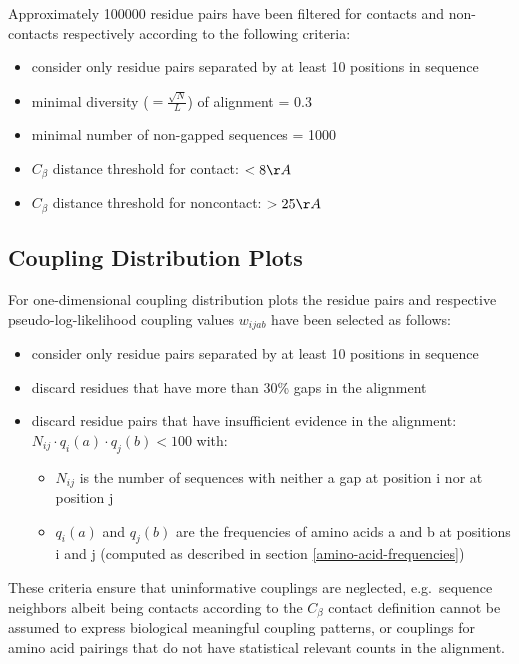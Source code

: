 \documentclass[12pt,a4paper,twoside]{book}
\providecommand{\tightlist}{%
  \setlength{\itemsep}{0pt}\setlength{\parskip}{0pt}}
\newcommand{\Cb}{C_\beta}
\newcommand{\wijab}{w_{ijab}}
\theoremstyle{definition}
\theoremstyle{definition}
\theoremstyle{remark}
\begin{document}
Approximately 100000 residue pairs have been filtered for contacts and
non-contacts respectively according to the following criteria:

\begin{itemize}
\tightlist
\item
  consider only residue pairs separated by at least 10 positions in
  sequence
\item
  minimal diversity (\(=\frac{\sqrt{N}}{L}\)) of alignment = 0.3
\item
  minimal number of non-gapped sequences = 1000
\item
  \(\Cb\) distance threshold for contact: \(<8\AA\)
\item
  \(\Cb\) distance threshold for noncontact: \(>25\AA\)
\end{itemize}

\subsection{Coupling Distribution Plots}\label{method-coupling-profile}

For one-dimensional coupling distribution plots the residue pairs and
respective pseudo-log-likelihood coupling values \(\wijab\) have been
selected as follows:

\begin{itemize}
\tightlist
\item
  consider only residue pairs separated by at least 10 positions in
  sequence
\item
  discard residues that have more than 30\% gaps in the alignment
\item
  discard residue pairs that have insufficient evidence in the
  alignment: \(N_{ij} \cdot q_i(a) \cdot q_j(b) < 100\) with:

  \begin{itemize}
  \tightlist
  \item
    \(N_{ij}\) is the number of sequences with neither a gap at position
    i nor at position j
  \item
    \(q_i(a)\) and \(q_j(b)\) are the frequencies of amino acids a and b
    at positions i and j (computed as described in section
    \ref{amino-acid-frequencies})
  \end{itemize}
\end{itemize}

These criteria ensure that uninformative couplings are neglected,
e.g.~sequence neighbors albeit being contacts according to the \(\Cb\)
contact definition cannot be assumed to express biological meaningful
coupling patterns, or couplings for amino acid pairings that do not have
statistical relevant counts in the alignment.
\end{document}
